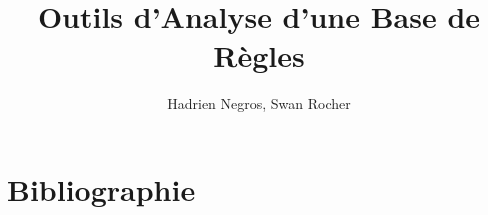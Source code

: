 \documentclass{report}
\author{Hadrien Negros, Swan Rocher}
\title{Outils d'Analyse d'une Base de R\`egles}
\begin{document}
\maketitle
\large
\newpage

\tableofcontents

\large
\setlength{\parskip}{5mm plus2mm minus2mm}

\begin{spacing}{1.5}
\chapter{}


\end{spacing}

%
\chapter{Bibliographie}\label{bibli}
%
\end{document}
